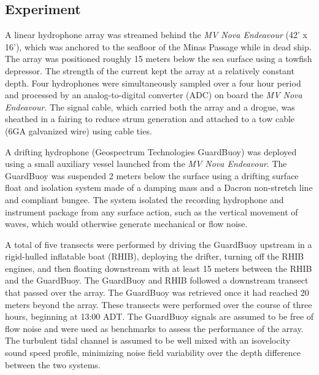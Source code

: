 \documentclass[12pt,journal,onecolumn]{IEEEtran}
\begin{document}
\subsection{Experiment}
A linear hydrophone array was streamed behind the \textit{MV Nova Endeavour} (42' x 16'), which was anchored to the seafloor of the Minas Passage while in dead ship. The array was positioned roughly 15 meters below the sea surface using a towfish depressor. The strength of the current kept the array at a relatively constant depth. Four hydrophones were simultaneously sampled over a four hour period and processed by an analog-to-digital converter (ADC) on board the \textit{MV Nova Endeavour}. The signal cable, which carried both the array and a drogue, was sheathed in a fairing to reduce strum generation and attached to a tow cable (6GA galvanized wire) using cable ties.

A drifting hydrophone (Geospectrum Technologies GuardBuoy) was deployed using a small auxiliary vessel launched from the \textit{MV Nova Endeavour}. The GuardBuoy was suspended 2 meters below the surface using a drifting surface float and isolation system made of a damping mass and a Dacron non-stretch line and compliant bungee.  The system isolated the recording hydrophone and instrument package from any surface action, such as the vertical movement of waves, which would otherwise generate mechanical or flow noise.

A total of five transects were performed by driving the GuardBuoy upstream in a rigid-hulled inflatable boat (RHIB), deploying the drifter, turning off the RHIB engines, and then floating downstream with at least 15 meters between the RHIB and the GuardBuoy. The GuardBuoy and RHIB followed a downstream transect that passed over the array. The GuardBuoy was retrieved once it had reached 20 meters beyond the array.
These transects were performed over the course of three hours, beginning at 13:00 ADT.
The GuardBuoy signals are assumed to be free of flow noise and were used as benchmarks to assess the performance of the array. The turbulent tidal channel is assumed to be well mixed with an isovelocity sound speed profile, minimizing noise field variability over the depth difference between the two systems.
\end{document}
